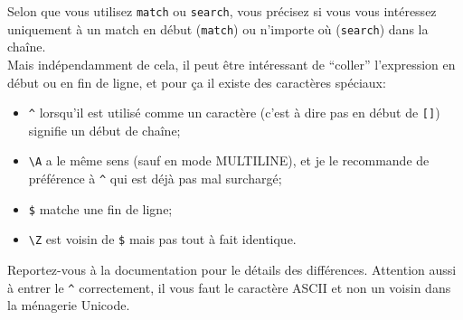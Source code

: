     Selon que vous utilisez \texttt{match} ou \texttt{search}, vous précisez
si vous vous intéressez uniquement à un match en début (\texttt{match})
ou n'importe où (\texttt{search}) dans la chaîne.\\

Mais indépendamment de cela, il peut être intéressant de ``coller''
l'expression en début ou en fin de ligne, et pour ça il existe des
caractères spéciaux:

\begin{itemize}
	\item 
	\texttt{\^{}} lorsqu'il est utilisé comme un
	caractère (c'est à dire pas en début de \texttt{{[}{]}}) signifie un
	début de chaîne;
	\item
	\texttt{\textbackslash{}A} a le même sens (sauf en
	mode MULTILINE), et je le recommande de préférence à \texttt{\^{}} qui
	est déjà pas mal surchargé;
	\item
	\texttt{\$} matche une fin de ligne;
	\item
	\texttt{\textbackslash{}Z} est voisin de \texttt{\$} mais pas tout à
	fait identique.
\end{itemize}

Reportez-vous à la documentation pour le détails des différences.
Attention aussi à entrer le \texttt{\^{}} correctement, il vous faut le
caractère ASCII et non un voisin dans la ménagerie Unicode.

